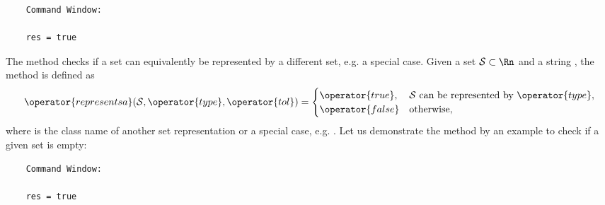 \begin{center}
\begin{minipage}[t]{0.40\textwidth}
	\vspace{10pt}
	\footnotesize
	
\end{minipage}
\begin{minipage}[t]{0.25\textwidth}
	\vspace{10pt}

	\begin{verbatim}	
	Command Window:
	
	res = true
	\end{verbatim}
\end{minipage}
\end{center}

\vspace{1cm}

 \label{sec:representsa}

The method  checks if a set can equivalently be represented by a different set, e.g. a special case.
Given a set $\mathcal{S} \subset \Rn$ and a string , the method  is defined as
	\begin{equation*}
		\operator{representsa}(\mathcal{S},\operator{type},\operator{tol}) =
		\begin{cases}
			\operator{true}, & \mathcal{S} \text{ can be represented by } \operator{type}, \\
			\operator{false} & \mathrm{otherwise},
		\end{cases}
	\end{equation*}
where  is the class name of another set representation or a special case, e.g. .
Let us demonstrate the method  by an example to check if a given set is empty:

\begin{center}
\begin{minipage}[t]{0.40\textwidth}
	\vspace{10pt}
	\footnotesize
	
\end{minipage}
\begin{minipage}[t]{0.2\textwidth}
	\vspace{10pt}

	\begin{verbatim}
	Command Window:
		
	res = true
	\end{verbatim}
\end{minipage}
\begin{minipage}[t]{0.3\textwidth}
	\vspace{0pt}
	\centering
\end{minipage}
\end{center}


